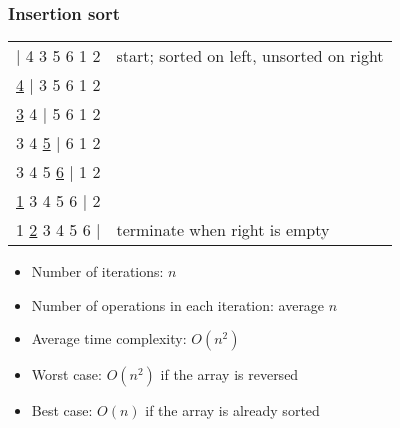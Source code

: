 \documentclass{beamer}
\begin{document}
\begin{frame}
 \frametitle{Insertion sort}
 \begin{center}
 \begin{tabular}{rl}
  $\vert$ 4 3 5 6 1 2 & start; sorted on left, unsorted on right \pause \\
  \underline{4} $\vert$ 3 5 6 1 2 & \pause \\
  \underline{3} 4 $\vert$ 5 6 1 2 & \pause \\
  3 4 \underline{5} $\vert$ 6 1 2 & \pause \\
  3 4 5 \underline{6} $\vert$ 1 2 & \pause \\
  \underline{1} 3 4 5 6 $\vert$ 2 & \pause \\
  1 \underline{2} 3 4 5 6 $\vert$ & terminate when right is empty \pause \\
 \end{tabular}
 \end{center}
 \begin{itemize}
  \item Number of iterations: $n$
  \item Number of operations in each iteration: average $n$
  \item Average time complexity: $O(n^2)$
  \item Worst case: $O(n^2)$ if the array is reversed
  \item Best case: $O(n)$ if the array is already sorted
 \end{itemize}
\end{frame}
\end{document}
